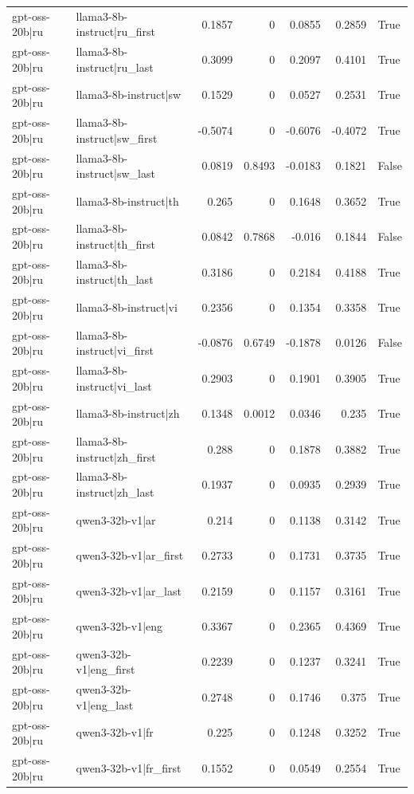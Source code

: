 \begin{table}
\begin{tabular}{l l r r r r l}
gpt-oss-20b|ru & llama3-8b-instruct|ru_first & 0.1857 & 0 & 0.0855 & 0.2859 & True \\
gpt-oss-20b|ru & llama3-8b-instruct|ru_last & 0.3099 & 0 & 0.2097 & 0.4101 & True \\
gpt-oss-20b|ru & llama3-8b-instruct|sw & 0.1529 & 0 & 0.0527 & 0.2531 & True \\
gpt-oss-20b|ru & llama3-8b-instruct|sw_first & -0.5074 & 0 & -0.6076 & -0.4072 & True \\
gpt-oss-20b|ru & llama3-8b-instruct|sw_last & 0.0819 & 0.8493 & -0.0183 & 0.1821 & False \\
gpt-oss-20b|ru & llama3-8b-instruct|th & 0.265 & 0 & 0.1648 & 0.3652 & True \\
gpt-oss-20b|ru & llama3-8b-instruct|th_first & 0.0842 & 0.7868 & -0.016 & 0.1844 & False \\
gpt-oss-20b|ru & llama3-8b-instruct|th_last & 0.3186 & 0 & 0.2184 & 0.4188 & True \\
gpt-oss-20b|ru & llama3-8b-instruct|vi & 0.2356 & 0 & 0.1354 & 0.3358 & True \\
gpt-oss-20b|ru & llama3-8b-instruct|vi_first & -0.0876 & 0.6749 & -0.1878 & 0.0126 & False \\
gpt-oss-20b|ru & llama3-8b-instruct|vi_last & 0.2903 & 0 & 0.1901 & 0.3905 & True \\
gpt-oss-20b|ru & llama3-8b-instruct|zh & 0.1348 & 0.0012 & 0.0346 & 0.235 & True \\
gpt-oss-20b|ru & llama3-8b-instruct|zh_first & 0.288 & 0 & 0.1878 & 0.3882 & True \\
gpt-oss-20b|ru & llama3-8b-instruct|zh_last & 0.1937 & 0 & 0.0935 & 0.2939 & True \\
gpt-oss-20b|ru & qwen3-32b-v1|ar & 0.214 & 0 & 0.1138 & 0.3142 & True \\
gpt-oss-20b|ru & qwen3-32b-v1|ar_first & 0.2733 & 0 & 0.1731 & 0.3735 & True \\
gpt-oss-20b|ru & qwen3-32b-v1|ar_last & 0.2159 & 0 & 0.1157 & 0.3161 & True \\
gpt-oss-20b|ru & qwen3-32b-v1|eng & 0.3367 & 0 & 0.2365 & 0.4369 & True \\
gpt-oss-20b|ru & qwen3-32b-v1|eng_first & 0.2239 & 0 & 0.1237 & 0.3241 & True \\
gpt-oss-20b|ru & qwen3-32b-v1|eng_last & 0.2748 & 0 & 0.1746 & 0.375 & True \\
gpt-oss-20b|ru & qwen3-32b-v1|fr & 0.225 & 0 & 0.1248 & 0.3252 & True \\
gpt-oss-20b|ru & qwen3-32b-v1|fr_first & 0.1552 & 0 & 0.0549 & 0.2554 & True \\

\end{tabular}
\end{table}
